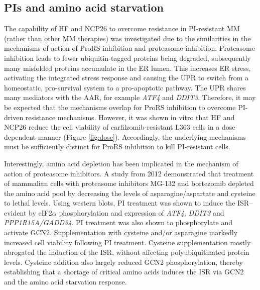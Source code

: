 \subsection{PIs and amino acid starvation}
The capability of HF and NCP26 to overcome resistance in PI-resistant MM (rather than other MM therapies) was investigated due to the similarities in the mechanisms of action of ProRS inhibition and proteasome inhibition.
Proteasome inhibition leads to fewer ubiquitin-tagged proteins being degraded, subsequently many misfolded proteins accumulate in the ER lumen.
This increases ER stress, activating the integrated stress response and causing the UPR to switch from a homeostatic, pro-survival system to a pro-apoptotic pathway\cite{kubiczkova2014proteasome, wallington2018resistance}.
The UPR shares many mediators with the AAR, for example \textit{ATF4} and \textit{DDIT3}.
Therefore, it may be expected that the mechanisms overlap for ProRS inhibition to overcome PI-driven resistance mechanisms.
However, it was shown in vitro that HF and NCP26 reduce the cell viability of carfilzomib-resistant L363 cells in a dose dependent manner (Figure \ref{fig:dose}).
Accordingly, the underlying mechanisms must be sufficiently distinct for ProRS inhibition to kill PI-resistant cells.

Interestingly, amino acid depletion has been implicated in the mechanism of action of proteasome inhibitors\cite{suraweera2012failure}.
A study from 2012 demonstrated that treatment of mammalian cells with proteasome inhibitors MG-132 and bortezomib depleted the amino acid pool by decreasing the levels of asparagine/aspartate and cysteine to lethal levels\cite{suraweera2012failure}.
Using western blots, PI treatment was shown to induce the ISR-- evident by eIF2$\alpha$ phosphorylation and expression of \textit{ATF4}, \textit{DDIT3} and \textit{PPP1R15A/GADD34}.
PI treatment was also shown to phosphorylate and activate GCN2.
Supplementation with cysteine and/or asparagine markedly increased cell viability following PI treatment.
Cysteine supplementation mostly abrogated the induction of the ISR, without affecting polyubiquitinated protein levels.
Cysteine addition also largely reduced GCN2 phosphorylation, thereby establishing that a shortage of critical amino acids induces the ISR via GCN2 and the amino acid starvation response\cite{suraweera2012failure}.

